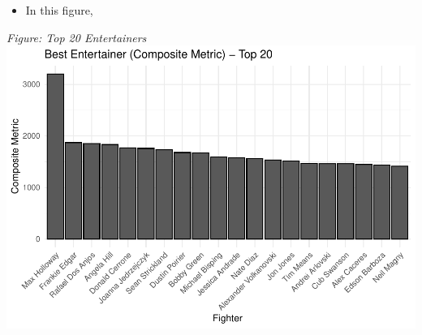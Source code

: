 \documentclass[
  man,floatsintext]{apa6}
\providecommand{\tightlist}{%
  \setlength{\itemsep}{0pt}\setlength{\parskip}{0pt}}
\begin{document}
\begin{itemize}
\tightlist
\item
  In this figure,
\end{itemize}

\emph{Figure: Top 20 Entertainers}
\includegraphics{Into-the-UFC--outline-_files/figure-latex/unnamed-chunk-2-1.pdf}
\end{document}
